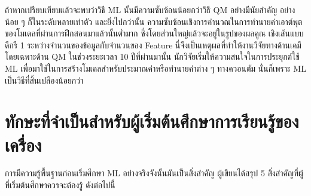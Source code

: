 ถ้าหากเปรียบเทียบแล้วจะพบว่าวิธี ML นั้นมีความซับซ้อนน้อยกว่าวิธี QM อย่างมีนัยสำคัญ อย่างน้อย ๆ ก็ในระดับหลายเท่าตัว และยิ่งไปกว่านั้น
ความซับซ้อนเชิงการคำนวณในการทำนายค่าเอาต์พุตของโมเดลที่ผ่านการฝึกสอนมาแล้วนั้นต่ำมาก ซึ่งโดยส่วนใหญ่แล้วจะอยู่ในรูปของผลคูณ%
เชิงเส้นแบบดีกรี 1 ระหว่างจำนวนของข้อมูลกับจำนวนของ Feature นี่จึงเป็นเหตุผลที่ทำให้งานวิจัยทางด้านเคมี โดยเฉพาะด้าน QM ในช่วงระยะเวลา
10 ปีที่ผ่านมานั้น นักวิจัยเริ่มให้ความสนใจในการประยุกต์ใช้ ML เพื่อมาใช้ในการสร้างโมเดลสำหรับประมาณค่าหรือทำนายค่าต่าง ๆ ทางควอนตัม 
นั่นก็เพราะ ML เป็นวิธีที่สิ้นเปลืองน้อยกว่า

\section{ทักษะที่จำเป็นสำหรับผู้เริ่มต้นศึกษาการเรียนรู้ของเครื่อง}
\label{sec:skills_for_ml}

การมีความรู้พื้นฐานก่อนเริ่มศึกษา ML อย่างจริงจังนั้นมันเป็นสิ่งสำคัญ ผู้เขียนได้สรุป 5 สิ่งสำคัญที่ผู้ที่เริ่มต้นศึกษาควรจะต้องรู้ ดังต่อไปนี้

